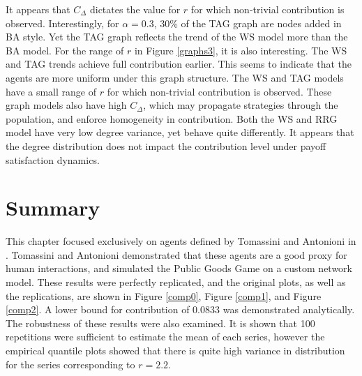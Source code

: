 \FloatBarrier
{}
\FloatBarrier
It appears that $C_\Delta$ dictates the value for $r$ for which non-trivial contribution is observed. Interestingly, for $\alpha = 0.3$, 30\% of the TAG graph are nodes added in BA style. Yet the TAG graph reflects the trend of the WS model more than the BA model.\FloatBarrier
{}
\FloatBarrier
For the range of $r$ in Figure \ref{graphs3}, it is also interesting. The WS and TAG trends achieve full contribution earlier. This seems to indicate that the agents are more uniform under this graph structure. The WS and TAG models have a small range of $r$ for which non-trivial contribution is observed. These graph models also have high $C_\Delta$, which may propagate strategies through the population, and enforce homogeneity in contribution. Both the WS and RRG model have very low degree variance, yet behave quite differently. It appears that the degree distribution does not impact the contribution level under payoff satisfaction dynamics. 

\section{Summary}

This chapter focused exclusively on agents defined by Tomassini and Antonioni in \cite{RN49}. Tomassini and Antonioni demonstrated that these agents are a good proxy for human interactions, and simulated the Public Goods Game on a custom network model. These results were perfectly replicated, and the original plots, as well as the replications, are shown in Figure \ref{comp0}, Figure \ref{comp1}, and Figure \ref{comp2}. A lower bound for contribution of 0.0833 was demonstrated analytically. The robustness of these results were also examined. It is shown that 100 repetitions were sufficient to estimate the mean of each series, however the empirical quantile plots showed that there is quite high variance in distribution for the series corresponding to $r=2.2$.\\ 

